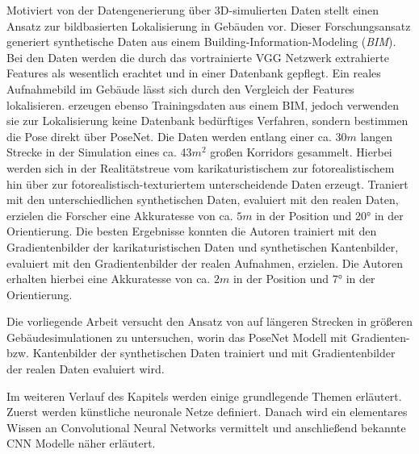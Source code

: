 Motiviert von der Datengenerierung über 3D-simulierten Daten stellt \citet{haImagebasedIndoorLocalization2018} einen Ansatz zur bildbasierten Lokalisierung in Gebäuden vor. Dieser Forschungsansatz generiert synthetische Daten aus einem Building-Information-Modeling (\textit{BIM}). Bei den Daten werden die durch das vortrainierte VGG Netzwerk \cite{simonyanVeryDeepConvolutional2014} extrahierte Features als wesentlich erachtet und in einer Datenbank gepflegt. Ein reales Aufnahmebild im Gebäude lässt sich durch den Vergleich der Features lokalisieren. \citet{acharyaBIMPoseNetIndoorCamera2019, acharyaMODELLINGUNCERTAINTYSINGLE2019} erzeugen ebenso Trainingsdaten aus einem BIM, jedoch verwenden sie zur Lokalisierung keine Datenbank bedürftiges Verfahren, sondern bestimmen die Pose direkt über PoseNet. Die Daten werden entlang einer ca. 30$m$ langen Strecke in der Simulation eines ca. 43$m^2$ großen Korridors gesammelt. Hierbei werden sich in der Realitätstreue vom karikaturistischem zur fotorealistischem hin über zur fotorealistisch-texturiertem unterscheidende Daten erzeugt.
Traniert mit den unterschiedlichen synthetischen Daten, evaluiert mit den realen Daten, erzielen die Forscher eine Akkuratesse von ca. $5m$ in der Position und 20° in der Orientierung.
Die besten Ergebnisse konnten die Autoren trainiert mit den Gradientenbilder der karikaturistischen Daten und synthetischen Kantenbilder, evaluiert mit den Gradientenbilder der realen Aufnahmen, erzielen. Die Autoren erhalten hierbei eine Akkuratesse von ca. $2m$ in der Position und 7° in der Orientierung.

Die vorliegende Arbeit versucht den Ansatz von \citet{acharyaBIMPoseNetIndoorCamera2019} auf längeren Strecken in größeren Gebäudesimulationen zu untersuchen, worin das PoseNet Modell mit Gradienten- bzw. Kantenbilder der synthetischen Daten trainiert und mit Gradientenbilder der realen Daten evaluiert wird.

Im weiteren Verlauf des Kapitels werden einige grundlegende Themen erläutert. Zuerst werden künstliche neuronale Netze definiert. Danach wird ein elementares Wissen an Convolutional Neural Networks vermittelt und anschließend bekannte CNN Modelle näher erläutert.

